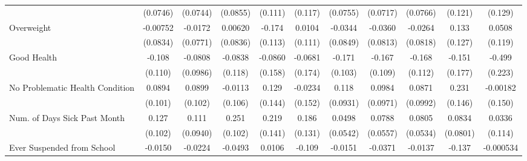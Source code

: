 {\begin{tabular}{l*{10}{c}}
            &    (0.0746)         &    (0.0744)         &    (0.0855)         &     (0.111)         &     (0.117)         &    (0.0755)         &    (0.0717)         &    (0.0766)         &     (0.121)         &     (0.129)         \\
\addlinespace
Overweight  &    -0.00752         &     -0.0172         &     0.00620         &      -0.174         &      0.0104         &     -0.0344         &     -0.0360         &     -0.0264         &       0.133         &      0.0508         \\
            &    (0.0834)         &    (0.0771)         &    (0.0836)         &     (0.113)         &     (0.111)         &    (0.0849)         &    (0.0813)         &    (0.0818)         &     (0.127)         &     (0.119)         \\
\addlinespace
Good Health &      -0.108         &     -0.0808         &     -0.0838         &     -0.0860         &     -0.0681         &      -0.171         &      -0.167         &      -0.168         &      -0.151         &      -0.499\sym{*}  \\
            &     (0.110)         &    (0.0986)         &     (0.118)         &     (0.158)         &     (0.174)         &     (0.103)         &     (0.109)         &     (0.112)         &     (0.177)         &     (0.223)         \\
\addlinespace
No Problematic Health Condition&      0.0894         &      0.0899         &     -0.0113         &       0.129         &     -0.0234         &       0.118         &      0.0984         &      0.0871         &       0.231         &    -0.00182         \\
            &     (0.101)         &     (0.102)         &     (0.106)         &     (0.144)         &     (0.152)         &    (0.0931)         &    (0.0971)         &    (0.0992)         &     (0.146)         &     (0.150)         \\
\addlinespace
Num. of Days Sick Past Month&       0.127         &       0.111         &       0.251\sym{*}  &       0.219         &       0.186         &      0.0498         &      0.0788         &      0.0805         &      0.0834         &      0.0336         \\
            &     (0.102)         &    (0.0940)         &     (0.102)         &     (0.141)         &     (0.131)         &    (0.0542)         &    (0.0557)         &    (0.0534)         &    (0.0801)         &     (0.114)         \\
\addlinespace
Ever Suspended from School&     -0.0150         &     -0.0224         &     -0.0493         &      0.0106         &      -0.109         &     -0.0151         &     -0.0371         &     -0.0137         &      -0.137         &   -0.000534         \\

\end{tabular}}
